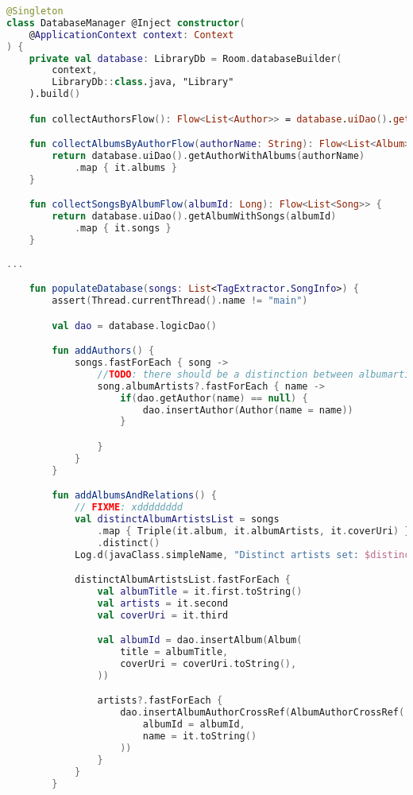 \begin{lstlisting}[caption=Strukutura klasy \texttt{DatabaseManager}, label={lst:DatabaseManager_struct}, language=kotlin]
@Singleton
class DatabaseManager @Inject constructor(
    @ApplicationContext context: Context
) {
    private val database: LibraryDb = Room.databaseBuilder(
        context,
        LibraryDb::class.java, "Library"
    ).build()

    fun collectAuthorsFlow(): Flow<List<Author>> = database.uiDao().getAllAuthorsFlow()

    fun collectAlbumsByAuthorFlow(authorName: String): Flow<List<Album>> {
        return database.uiDao().getAuthorWithAlbums(authorName)
            .map { it.albums }
    }

    fun collectSongsByAlbumFlow(albumId: Long): Flow<List<Song>> {
        return database.uiDao().getAlbumWithSongs(albumId)
            .map { it.songs }
    }
	
...

    fun populateDatabase(songs: List<TagExtractor.SongInfo>) {
        assert(Thread.currentThread().name != "main")

        val dao = database.logicDao()

        fun addAuthors() {
            songs.fastForEach { song ->
                //TODO: there should be a distinction between albumartists and regular artists
                song.albumArtists?.fastForEach { name ->
                    if(dao.getAuthor(name) == null) {
                        dao.insertAuthor(Author(name = name))
                    }

                }
            }
        }

        fun addAlbumsAndRelations() {
            // FIXME: xdddddddd
            val distinctAlbumArtistsList = songs
                .map { Triple(it.album, it.albumArtists, it.coverUri) }
                .distinct()
            Log.d(javaClass.simpleName, "Distinct artists set: $distinctAlbumArtistsList")

            distinctAlbumArtistsList.fastForEach {
                val albumTitle = it.first.toString()
                val artists = it.second
                val coverUri = it.third

                val albumId = dao.insertAlbum(Album(
                    title = albumTitle,
                    coverUri = coverUri.toString(),
                ))

                artists?.fastForEach {
                    dao.insertAlbumAuthorCrossRef(AlbumAuthorCrossRef(
                        albumId = albumId,
                        name = it.toString()
                    ))
                }
            }
        }


\end{lstlisting}
